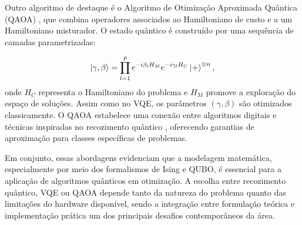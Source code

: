 Outro algoritmo de destaque é o Algoritmo de Otimização Aproximada Quântica (QAOA) \cite{farhi_quantum_2014}, que combina operadores associados ao Hamiltoniano de custo e a um Hamiltoniano misturador. O estado quântico é construído por uma sequência de camadas parametrizadas:

\begin{equation}
    \ket{\gamma, \beta} = \prod_{l=1}^{p} e^{-i \beta_l H_M} e^{-i \gamma_l H_C} \ket{+}^{\otimes n},
\end{equation}
onde $H_C$ representa o Hamiltoniano do problema e $H_M$ promove a exploração do espaço de soluções. Assim como no VQE, os parâmetros $(\gamma, \beta)$ são otimizados classicamente. O QAOA estabelece uma conexão entre algoritmos digitais \cite{farhi_quantum_2014} e técnicas inspiradas no recozimento quântico \cite{zhou2020quantum}, oferecendo garantias de aproximação para classes específicas de problemas.

Em conjunto, essas abordagens evidenciam que a modelagem matemática, especialmente por meio dos formalismos de Ising e QUBO, é essencial para a aplicação de algoritmos quânticos em otimização. A escolha entre recozimento quântico, VQE ou QAOA depende tanto da natureza do problema quanto das limitações do hardware disponível, sendo a integração entre formulação teórica e implementação prática um dos principais desafios contemporâneos da área.
